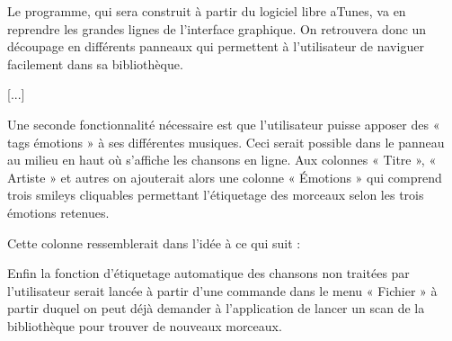 Le programme, qui sera construit à partir du logiciel libre aTunes, va en reprendre les grandes lignes de l'interface graphique.
On retrouvera donc un découpage en différents panneaux qui permettent à l'utilisateur de naviguer facilement dans sa bibliothèque.

[...]

Une seconde fonctionnalité nécessaire est que l'utilisateur puisse apposer des « tags émotions » à ses différentes musiques.
Ceci serait possible dans le panneau au milieu en haut où s'affiche les chansons en ligne.
Aux colonnes « Titre », « Artiste » et autres on ajouterait alors une colonne « Émotions » qui comprend trois smileys cliquables permettant l'étiquetage des morceaux selon les trois émotions retenues.

Cette colonne ressemblerait dans l'idée à ce qui suit :

\vspace{1em}
\vspace{1em}


Enfin la fonction d'étiquetage automatique des chansons non traitées par l'utilisateur serait lancée à partir d'une commande dans le menu « Fichier » à partir duquel on peut déjà demander à l'application de lancer un scan de la bibliothèque pour trouver de nouveaux morceaux.